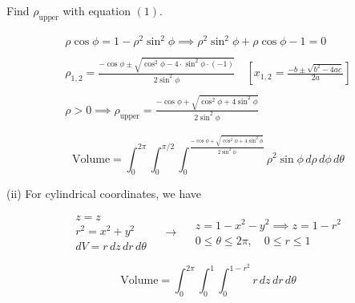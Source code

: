 \documentclass{article}
\begin{document}
\hfill

\noindent Find $\rho_{\text{upper}}$ with equation $(1)$.

\[
\begin{array}{c}
\rho\cos\phi=1-\rho^2\sin^2\phi\implies \rho^2\sin^2\phi+\rho\cos\phi-1=0\\\\
\displaystyle \rho_{1,2} = \frac{-\cos\phi \pm\sqrt{\cos^2\phi-4\cdot\sin^2\phi\cdot(-1)}}{2\sin^2\phi}\quad\left[x_{1,2}=\frac{-b\pm\sqrt{b^2-4ac}}{2a}\right]\\\\
\displaystyle \rho>0\implies\rho_{\text{upper}}=\frac{-\cos\phi +\sqrt{\cos^2\phi+4\sin^2\phi}}{2\sin^2\phi}
\end{array}
\]

\hfill

\[\boxed{\text{Volume}=\int_0^{2\pi}\int_0^{\pi/2}\int_0^{\textstyle\frac{-\cos\phi +\sqrt{\cos^2\phi+4\sin^2\phi}}{2\sin^2\phi}}\rho^2\sin\phi\,d\rho\,d\phi\,d\theta}\]

\hfill

\noindent (ii) For cylindrical coordinates, we have

\[
\begin{array}{c}
z=z\\
r^2=x^2+y^2\\
dV=r\,dz\,dr\,d\theta
\end{array}\quad\rightarrow\quad
\begin{array}{c}
z=1-x^2-y^2\implies z=1-r^2\\
0\leq\theta\leq2\pi,\quad 0\leq r \leq1
\end{array}
\]

\[\boxed{\text{Volume}=\int_0^{2\pi}\int_0^1\int_0^{1-r^2}r\,dz\,dr\,d\theta}\]
\end{document}
